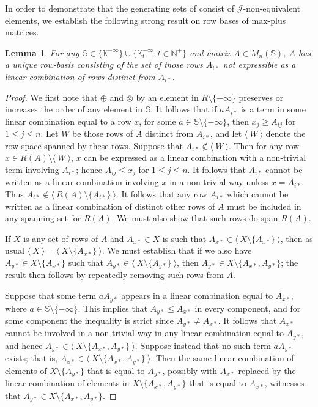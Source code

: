 \documentclass[11pt]{article}
\newtheorem{lemma}[thm]{Lemma}
\numberwithin{equation}{section}
\newcommand{\set}[2]{\ensuremath{\{#1 : #2 \}}}
\newcommand{\genset}[1]{\ensuremath{\langle\: #1 \:\rangle}}
\renewcommand{\S}{\mathbb{S}}
\newcommand{\J}{\mathscr{J}}
\newcommand{\N}{\mathbb{N}}
\newcommand{\Np}{\N^{+}}
\newcommand{\K}{\mathbb{K}}
\newcommand{\Kmax}{\K^{-\infty}}
\newcommand{\Kmaxt}{\K^{-\infty}_t}
\begin{document}
In order to demonstrate that the generating sets of
 consist of $\J$-non-equivalent elements, we establish
the following strong result on row bases of max-plus matrices.
\begin{lemma}
  For any $\S \in \{\Kmax\} \cup \set{\Kmaxt}{t \in \Np}$ and matrix $A \in
  M_n(\S)$, $A$ has a unique row-basis consisting of the set of those rows
  $A_{i*}$ not expressible as a linear combination of rows distinct from
  $A_{i*}$.
\end{lemma}
\begin{proof}
We first note that $\oplus$ and $\otimes$ by an element in
$R\setminus\{-\infty\}$ preserves or increases the order of any element in
$\S$. It follows that if $aA_{i*}$ is a term in some linear combination
equal to a row $x$, for some $a \in \S\setminus\{-\infty\}$, then $x_j \geq A_{ij}$
for $1 \leq j \leq n$. Let $W$ be those rows of $A$ distinct from $A_{i*}$, and
let $\genset{W}$ denote the row space spanned by these rows. Suppose that
$A_{i*} \not\in \genset{W}$. Then for any row $x \in R(A)\setminus \genset{W}$,
$x$ can be expressed as a linear combination with a non-trivial term involving
$A_{i*}$; hence $A_{ij} \leq x_j$ for $1 \leq j \leq n$. It follows that
$A_{i*}$ cannot be written as a linear combination involving $x$ in a
non-trivial way unless $x = A_{i*}$. Thus $A_{i*} \not\in \genset{R(A) \setminus
  \{ A_{i*} \}}$. It follows that any row $A_{i*}$ which cannot be written as a
linear combination of distinct other rows of $A$ must be included in any
spanning set for $R(A)$. We must also show that such rows do span $R(A)$.

If $X$ is any set of rows of $A$ and $A_{x*} \in X$ is such that $A_{x*} \in
\genset{X \setminus\{A_{x*}\}}$, then as usual $\genset{X} = \genset{X \setminus
  \{A_{x*}\}}$. We must establish that if we also have $A_{y*} \in X\setminus\{A_{x*}\}$
such that $A_{y*} \in \genset{X\setminus\{A_{y*}\}}$, then $A_{y*} \in
X\setminus\{A_{x*}, A_{y*}\}$; the result then follows by repeatedly removing
such rows from $A$. 

Suppose that some term $aA_{y*}$ appears in a linear combination equal
to $A_{x*}$, where $a \in \S\setminus\{-\infty\}$. This implies that $A_{y*} \leq
A_{x*}$ in every component, and for some component the inequality is strict since
$A_{y*} \neq A_{x*}$. It follows that $A_{x*}$ cannot be involved in a
non-trivial way in any linear combination equal to $A_{y*}$, and hence $A_{y*}
\in \genset{X \setminus\{A_{x*}, A_{y*}\}}$. Suppose instead that no such term
$aA_{y*}$ exists; that is, $A_{x*} \in \genset{X \setminus\{A_{x*}, A_{y*}\}}$.
Then the same linear combination of elements of $X\setminus\{A_{y*}\}$ that is
equal to $A_{y*}$, possibly with $A_{x*}$ replaced by the linear
combination of elements in $X \setminus\{A_{x*}, A_{y*}\}$ that is equal to
$A_{x*}$, witnesses that $A_{y*} \in X\setminus\{A_{x*}, A_{y*}\}$.
\end{proof}
\end{document}
